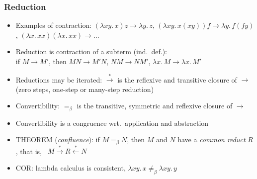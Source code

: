 \documentclass[handout]{beamer}
\newcommand{\lam}[2]{\lambda{#1.\,#2}}
\newcommand{\rtr}{\stackrel{*}{\to}}
\newcommand{\ltr}{\stackrel{*}{\leftarrow}}
\begin{document}
\frame
  {
  
    \frametitle{Reduction}

    \begin{itemize}[<+->]
    \item Examples of contraction: $(\lam{x y}{x})z \to \lam{y}{z}$,
      $(\lam{x y}{x(xy)})f \to \lam{y}{f(fy)}$, $(\lam{x}{xx})(\lam{x}{xx})\to\ldots$    
    \item Reduction is contraction of a subterm (ind.\ def.):\\ if $M\to M'$, then $MN\to M'N$, $NM\to NM'$, $\lam{x}{M}\to \lam{x}{M'}$
    \item Reductions may be iterated: $\rtr$ is the reflexive and transitive closure of $\to$ (zero steps, one-step or many-step reduction)
    \item Convertibility: $=_\beta$ is the transitive, symmetric and reflexive closure of $\to$
    \item Convertibility is a congruence wrt.\ application and abstraction
    \item THEOREM (\emph{confluence}): if $M=_\beta N$, then $M$ and $N$ have a \emph{common reduct} $R$, that is, \ $M\rtr R\ltr N$
    \item COR: lambda calculus is consistent, $\lam{x y}{x}\not=_\beta\lam{x y}{y}$
    \end{itemize}
  }
\end{document}
